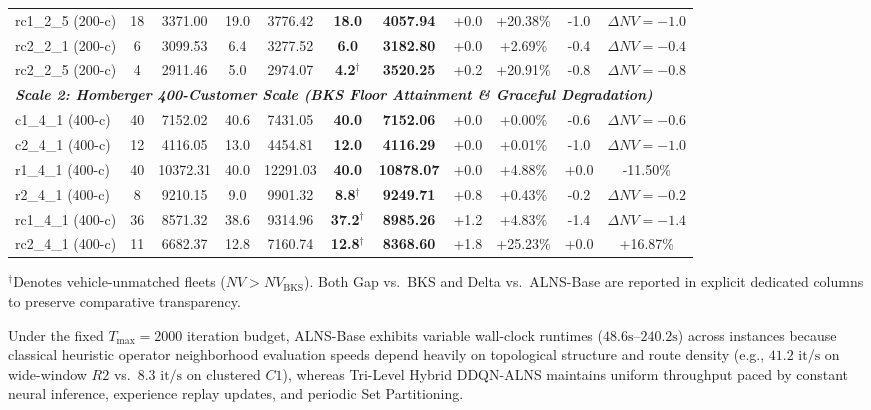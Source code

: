 \documentclass{ieeeaccess}
\begin{document}
\begin{table}[!t]
\begin{tabular*}{\textwidth}{@{\extracolsep{\fill}} l cc cc cc cc cc @{}}
rc1\_2\_5 (200-c) & 18 & 3371.00 & 19.0 & 3776.42 & \textbf{18.0} & \textbf{4057.94} & +0.0 & +20.38\% & -1.0 & $\Delta NV=-1.0$ \\
rc2\_2\_1 (200-c) & 6 & 3099.53 & 6.4 & 3277.52 & \textbf{6.0} & \textbf{3182.80} & +0.0 & +2.69\% & -0.4 & $\Delta NV=-0.4$ \\
rc2\_2\_5 (200-c) & 4 & 2911.46 & 5.0 & 2974.07 & \textbf{4.2}$^\dagger$ & \textbf{3520.25} & +0.2 & +20.91\% & -0.8 & $\Delta NV=-0.8$ \\
\midrule
\multicolumn{11}{l}{\textit{\textbf{Scale 2: Homberger 400-Customer Scale (BKS Floor Attainment \& Graceful Degradation)}}} \\
c1\_4\_1 (400-c) & 40 & 7152.02 & 40.6 & 7431.05 & \textbf{40.0} & \textbf{7152.06} & +0.0 & +0.00\% & -0.6 & $\Delta NV=-0.6$ \\
c2\_4\_1 (400-c) & 12 & 4116.05 & 13.0 & 4454.81 & \textbf{12.0} & \textbf{4116.29} & +0.0 & +0.01\% & -1.0 & $\Delta NV=-1.0$ \\
r1\_4\_1 (400-c) & 40 & 10372.31 & 40.0 & 12291.03 & \textbf{40.0} & \textbf{10878.07} & +0.0 & +4.88\% & +0.0 & -11.50\% \\
r2\_4\_1 (400-c) & 8 & 9210.15 & 9.0 & 9901.32 & \textbf{8.8}$^\dagger$ & \textbf{9249.71} & +0.8 & +0.43\% & -0.2 & $\Delta NV=-0.2$ \\
rc1\_4\_1 (400-c) & 36 & 8571.32 & 38.6 & 9314.96 & \textbf{37.2}$^\dagger$ & \textbf{8985.26} & +1.2 & +4.83\% & -1.4 & $\Delta NV=-1.4$ \\
rc2\_4\_1 (400-c) & 11 & 6682.37 & 12.8 & 7160.74 & \textbf{12.8}$^\dagger$ & \textbf{8368.60} & +1.8 & +25.23\% & +0.0 & +16.87\% \\
\bottomrule
\end{tabular*}
{\raggedright \footnotesize $^\dagger$Denotes vehicle-unmatched fleets ($NV > NV_{\text{BKS}}$). Both Gap vs.\ BKS and Delta vs.\ ALNS-Base are reported in explicit dedicated columns to preserve comparative transparency.\par}
\end{table}

Under the fixed $T_{\max}=2000$ iteration budget, ALNS-Base exhibits variable wall-clock runtimes ($48.6\text{s}$--$240.2\text{s}$) across instances because classical heuristic operator neighborhood evaluation speeds depend heavily on topological structure and route density (e.g., $41.2\text{ it/s}$ on wide-window $R2$ vs.\ $8.3\text{ it/s}$ on clustered $C1$), whereas Tri-Level Hybrid DDQN-ALNS maintains uniform throughput paced by constant neural inference, experience replay updates, and periodic Set Partitioning.
\end{document}
